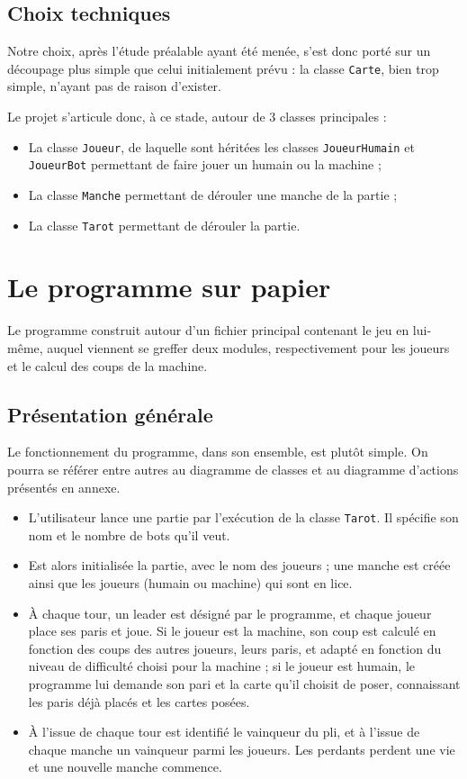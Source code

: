    \subsection{Choix techniques}\label{subsec:choix-techniques}
      Notre choix, après l'étude préalable ayant été menée, s'est donc porté sur un découpage plus simple que celui initialement prévu : la classe \texttt{Carte}, bien trop simple, n'ayant pas de raison d'exister.

      Le projet s'articule donc, à ce stade, autour de 3 classes principales :
      \begin{itemize}
         \item La classe \texttt{Joueur}, de laquelle sont héritées les classes \texttt{JoueurHumain} et \texttt{JoueurBot} permettant de faire jouer un humain ou la machine ;
         \item La classe \texttt{Manche} permettant de dérouler une manche de la partie ;
         \item La classe \texttt{Tarot} permettant de dérouler la partie.
      \end{itemize}


\section{Le programme sur papier}\label{sec:le-programme-sur-papier}
   Le programme construit autour d'un fichier principal contenant le jeu en lui-même, auquel viennent se greffer deux modules, respectivement pour les joueurs et le calcul des coups de la machine.

   \subsection{Présentation générale}\label{subsec:présentation-générale}
      Le fonctionnement du programme, dans son ensemble, est plutôt simple.
      On pourra se référer entre autres au diagramme de classes et au diagramme d'actions présentés en annexe.
      \begin{itemize}
         \item L'utilisateur lance une partie par l'exécution de la classe \texttt{Tarot}.
         Il spécifie son nom et le nombre de bots qu'il veut.
         \item Est alors initialisée la partie, avec le nom des joueurs ;
         une manche est créée ainsi que les joueurs (humain ou machine) qui sont en lice.
         \item À chaque tour, un leader est désigné par le programme, et chaque joueur place ses paris et joue.
         Si le joueur est la machine, son coup est calculé en fonction des coups des autres joueurs, leurs paris, et adapté en fonction du niveau de difficulté choisi pour la machine ;
         si le joueur est humain, le programme lui demande son pari et la carte qu'il choisit de poser, connaissant les paris déjà placés et les cartes posées.
         \item À l'issue de chaque tour est identifié le vainqueur du pli, et à l'issue de chaque manche un vainqueur parmi les joueurs.
         Les perdants perdent une vie et une nouvelle manche commence.
      \end{itemize}


